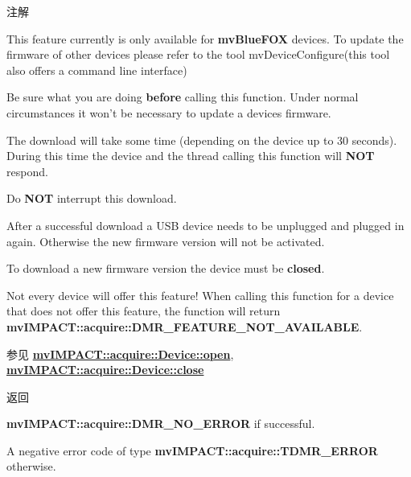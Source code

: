 \begin{DoxyNote}{注解}

\begin{DoxyItemize}
\item This feature currently is only available for {\bfseries mv\+Blue\+F\+O\+X} devices. To update the firmware of other devices please refer to the tool {\ttfamily mv\+Device\+Configure(this tool also offers a command line interface)} 
\item Be sure what you are doing {\bfseries before} calling this function. Under normal circumstances it won't be necessary to update a devices firmware.
\item The download will take some time (depending on the device up to 30 seconds). During this time the device and the thread calling this function will {\bfseries N\+O\+T} respond.
\item Do {\bfseries N\+O\+T} interrupt this download.
\item After a successful download a U\+S\+B device needs to be unplugged and plugged in again. Otherwise the new firmware version will not be activated.
\item To download a new firmware version the device must be {\bfseries closed}.
\item Not every device will offer this feature! When calling this function for a device that does not offer this feature, the function will return {\bfseries mv\+I\+M\+P\+A\+C\+T\+::acquire\+::\+D\+M\+R\+\_\+\+F\+E\+A\+T\+U\+R\+E\+\_\+\+N\+O\+T\+\_\+\+A\+V\+A\+I\+L\+A\+B\+L\+E}.
\end{DoxyItemize}
\end{DoxyNote}
\begin{DoxySeeAlso}{参见}
{\bfseries \hyperlink{classmv_i_m_p_a_c_t_1_1acquire_1_1_device_adf4cb4c232b202a51c7161caf9b36165}{mv\+I\+M\+P\+A\+C\+T\+::acquire\+::\+Device\+::open}}, ~\newline
 {\bfseries \hyperlink{classmv_i_m_p_a_c_t_1_1acquire_1_1_device_a00da7acbf28c1591163682b7bdf611a4}{mv\+I\+M\+P\+A\+C\+T\+::acquire\+::\+Device\+::close}} 
\end{DoxySeeAlso}
\begin{DoxyReturn}{返回}

\begin{DoxyItemize}
\item {\bfseries mv\+I\+M\+P\+A\+C\+T\+::acquire\+::\+D\+M\+R\+\_\+\+N\+O\+\_\+\+E\+R\+R\+O\+R} if successful.
\item A negative error code of type {\bfseries mv\+I\+M\+P\+A\+C\+T\+::acquire\+::\+T\+D\+M\+R\+\_\+\+E\+R\+R\+O\+R} otherwise. 
\end{DoxyItemize}
\end{DoxyReturn}


